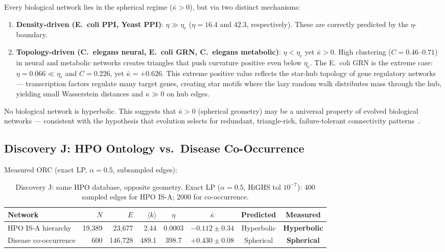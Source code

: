 \documentclass[11pt,a4paper]{article}
\newcommand{\kbar}{\bar{\kappa}}
\newcommand{\kavg}{\langle k \rangle}
\newcommand{\etac}{\eta_c}
\begin{document}
Every biological network lies in the spherical regime ($\kbar > 0$), but via two distinct mechanisms:
\begin{enumerate}
    \item \textbf{Density-driven (E.\ coli PPI, Yeast PPI)}: $\eta \gg \etac$ ($\eta = 16.4$ and $42.3$, respectively). These are correctly predicted by the $\eta$-boundary.

    \item \textbf{Topology-driven (C.\ elegans neural, E.\ coli GRN, C.\ elegans metabolic)}: $\eta < \etac$ yet $\kbar > 0$. High clustering ($C = 0.46$--$0.71$) in neural and metabolic networks creates triangles that push curvature positive even below $\etac$. The E.\ coli GRN is the extreme case: $\eta = 0.066 \ll \etac$ and $C = 0.226$, yet $\kbar = +0.626$. This extreme positive value reflects the star-hub topology of gene regulatory networks --- transcription factors regulate many target genes, creating star motifs where the lazy random walk distributes mass through the hub, yielding small Wasserstein distances and $\kappa \gg 0$ on hub edges.
\end{enumerate}

No biological network is hyperbolic. This suggests that $\kbar > 0$ (spherical geometry) may be a universal property of evolved biological networks --- consistent with the hypothesis that evolution selects for redundant, triangle-rich, failure-tolerant connectivity patterns~\cite{barabasi2004network}.

\subsection{Discovery J: HPO Ontology vs.\ Disease Co-Occurrence}
\label{sec:discovery_j}

Measured ORC (exact LP, $\alpha=0.5$, subsampled edges):

\begin{table}[h]
\centering
\small
\begin{tabular}{@{}lrrrcccc@{}}
\toprule
Network & $N$ & $E$ & $\kavg$ & $\eta$ & $\kbar$ & Predicted & Measured \\
\midrule
HPO IS-A hierarchy    & 19,389 & 23,677 & 2.44  & 0.0003  & $-0.112\pm0.34$ & Hyperbolic & \textbf{Hyperbolic} \\
Disease co-occurrence & 600    & 146,728 & 489.1 & 398.7  & $+0.430\pm0.08$ & Spherical  & \textbf{Spherical}  \\
\bottomrule
\end{tabular}
\caption{Discovery J: same HPO database, opposite geometry. Exact LP ($\alpha=0.5$, HiGHS tol $10^{-7}$): 400 sampled edges for HPO IS-A; 2000 for co-occurrence.}
\label{tab:discovery_j}
\end{table}
\end{document}
